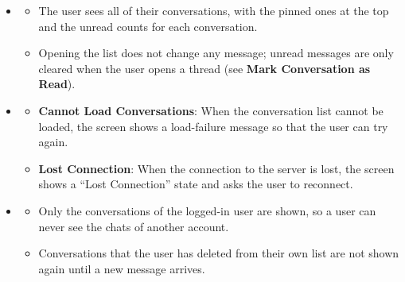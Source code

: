 \begin{itemize}[leftmargin=1.6em,topsep=4pt,itemsep=3pt,parsep=0pt,label=$\bullet$]
        \begin{itemize}[leftmargin=2.2em,topsep=2pt,itemsep=3pt,parsep=0pt,label=$\circ$]
            \item \textbf{No Conversation}: When the user has no conversation at all, the screen shows the empty-state prompt (no separate ``New message'' button is rendered in the empty view).
            \item \textbf{No Search Result}: When the search keyword does not match any conversation, the list is replaced by a message telling the user that no chat matches the keyword.
        \end{itemize}
    \item {}

        \begin{itemize}[leftmargin=2.2em,topsep=2pt,itemsep=3pt,parsep=0pt,label=$\circ$]
            \item The user sees all of their conversations, with the pinned ones at the top and the unread counts for each conversation.
            \item Opening the list does not change any message; unread messages are only cleared when the user opens a thread (see \textbf{Mark Conversation as Read}).
        \end{itemize}
    \item {}

        \begin{itemize}[leftmargin=2.2em,topsep=2pt,itemsep=3pt,parsep=0pt,label=$\circ$]
            \item \textbf{Cannot Load Conversations}: When the conversation list cannot be loaded, the screen shows a load-failure message so that the user can try again.
            \item \textbf{Lost Connection}: When the connection to the server is lost, the screen shows a ``Lost Connection'' state and asks the user to reconnect.
        \end{itemize}
    \item {}

        \begin{itemize}[leftmargin=2.2em,topsep=2pt,itemsep=3pt,parsep=0pt,label=$\circ$]
            \item Only the conversations of the logged-in user are shown, so a user can never see the chats of another account.
            \item Conversations that the user has deleted from their own list are not shown again until a new message arrives.
        \end{itemize}
\end{itemize}

